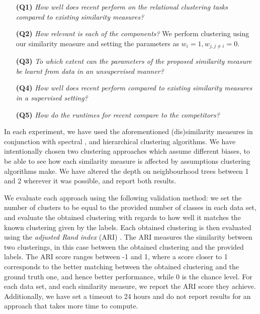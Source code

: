 \begin{itemize}
    \item[\textbf{(Q1)}]\textit{How well does \gls{recent} perform on the relational clustering tasks compared to existing similarity measures?}

    \item[\textbf{(Q2)}] \textit{How relevant is each of the components?}  We perform clustering using our similarity measure and setting the parameters as $w_i = 1, w_{j, j \not=i}=0$.

    \item[\textbf{(Q3)}] \textit{To which extent can the parameters of the proposed similarity measure  be learnt from data in an unsupervised manner?}

    \item[\textbf{(Q4)}] \textit{How well does \gls{recent} perform compared to existing similarity measures in a supervised setting?}

    \item[\textbf{(Q5)}] \textit{How do the runtimes for \gls{recent} compare to the competitors?}
\end{itemize}








In each experiment, we have used the aforementioned (dis)similarity measures in conjunction with spectral \cite{Spectral},  and hierarchical \cite{Agglomerative} clustering algorithms.
We have intentionally chosen two clustering approaches which assume different biases, to be able to see how each similarity measure is affected by assumptions clustering algorithms make.
We have altered the depth on neighbourhood trees between 1 and 2 wherever it was possible, and report both results.




We evaluate each approach using the following validation method: we set the number of clusters to be equal to the provided number of classes in each data set, and evaluate the obtained clustering with regards to how well it matches the known clustering given by the labels.
Each obtained clustering is then evaluated using the \textit{adjusted Rand index} (ARI)  \cite{Rand71,MoreyARI}.
The ARI measures the similarity between two clusterings, in this case between the obtained clustering and the provided labels.
The ARI score ranges between -1 and 1, where a score closer to 1 corresponds to the better matching between the obtained clustering and the ground truth one, and hence better performance, while 0 is the chance level.
For each data set, and each similarity measure, we report the ARI score they achieve.
Additionally, we have set a timeout to 24 hours and do not report results for an approach that takes more time to compute.





